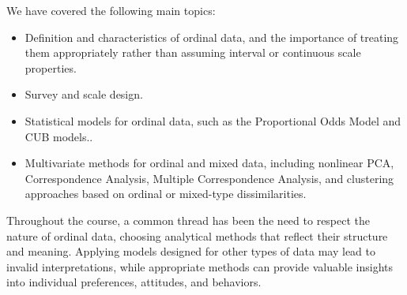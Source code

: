 \documentclass[
  letterpaper,
  DIV=11,
  numbers=noendperiod]{scrartcl}
\begin{document}
We have covered the following main topics:

\begin{itemize}
\item
  Definition and characteristics of ordinal data, and the importance of
  treating them appropriately rather than assuming interval or
  continuous scale properties.
\item
  Survey and scale design.
\item
  Statistical models for ordinal data, such as the Proportional Odds
  Model and CUB models..
\item
  Multivariate methods for ordinal and mixed data, including nonlinear
  PCA, Correspondence Analysis, Multiple Correspondence Analysis, and
  clustering approaches based on ordinal or mixed-type dissimilarities.
\end{itemize}

Throughout the course, a common thread has been the need to respect the
nature of ordinal data, choosing analytical methods that reflect their
structure and meaning. Applying models designed for other types of data
may lead to invalid interpretations, while appropriate methods can
provide valuable insights into individual preferences, attitudes, and
behaviors.
\end{document}
